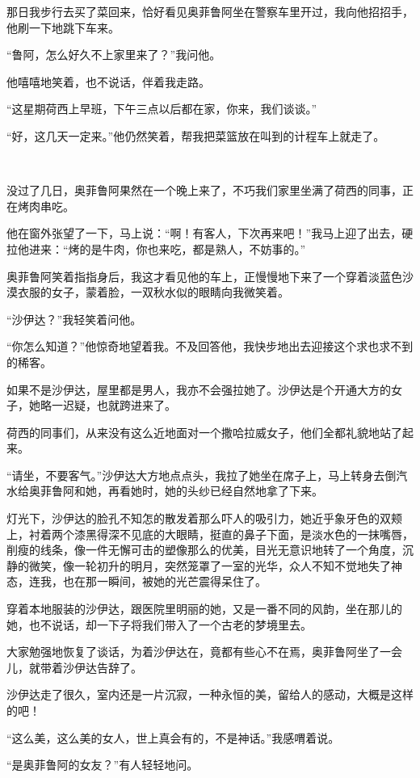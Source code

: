 \par 那日我步行去买了菜回来，恰好看见奥菲鲁阿坐在警察车里开过，我向他招招手，他刷一下地跳下车来。
\par “鲁阿，怎么好久不上家里来了？”我问他。
\par 他嘻嘻地笑着，也不说话，伴着我走路。
\par “这星期荷西上早班，下午三点以后都在家，你来，我们谈谈。”
\par “好，这几天一定来。”他仍然笑着，帮我把菜篮放在叫到的计程车上就走了。
\par  
\par 没过了几日，奥菲鲁阿果然在一个晚上来了，不巧我们家里坐满了荷西的同事，正在烤肉串吃。
\par 他在窗外张望了一下，马上说：“啊！有客人，下次再来吧！”我马上迎了出去，硬拉他进来：“烤的是牛肉，你也来吃，都是熟人，不妨事的。”
\par 奥菲鲁阿笑着指指身后，我这才看见他的车上，正慢慢地下来了一个穿着淡蓝色沙漠衣服的女子，蒙着脸，一双秋水似的眼睛向我微笑着。
\par “沙伊达？”我轻笑着问他。
\par “你怎么知道？”他惊奇地望着我。不及回答他，我快步地出去迎接这个求也求不到的稀客。
\par 如果不是沙伊达，屋里都是男人，我亦不会强拉她了。沙伊达是个开通大方的女子，她略一迟疑，也就跨进来了。
\par 荷西的同事们，从来没有这么近地面对一个撒哈拉威女子，他们全都礼貌地站了起来。
\par “请坐，不要客气。”沙伊达大方地点点头，我拉了她坐在席子上，马上转身去倒汽水给奥菲鲁阿和她，再看她时，她的头纱已经自然地拿了下来。
\par 灯光下，沙伊达的脸孔不知怎的散发着那么吓人的吸引力，她近乎象牙色的双颊上，衬着两个漆黑得深不见底的大眼睛，挺直的鼻子下面，是淡水色的一抹嘴唇，削瘦的线条，像一件无懈可击的塑像那么的优美，目光无意识地转了一个角度，沉静的微笑，像一轮初升的明月，突然笼罩了一室的光华，众人不知不觉地失了神态，连我，也在那一瞬间，被她的光芒震得呆住了。
\par 穿着本地服装的沙伊达，跟医院里明丽的她，又是一番不同的风韵，坐在那儿的她，也不说话，却一下子将我们带入了一个古老的梦境里去。
\par 大家勉强地恢复了谈话，为着沙伊达在，竟都有些心不在焉，奥菲鲁阿坐了一会儿，就带着沙伊达告辞了。
\par 沙伊达走了很久，室内还是一片沉寂，一种永恒的美，留给人的感动，大概是这样的吧！
\par “这么美，这么美的女人，世上真会有的，不是神话。”我感喟着说。
\par “是奥菲鲁阿的女友？”有人轻轻地问。
